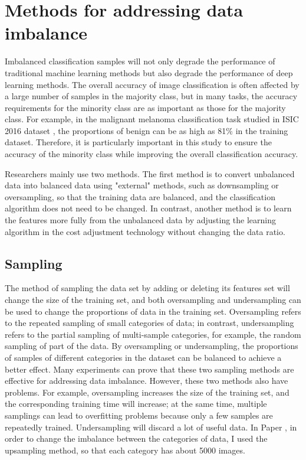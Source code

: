 \section{Methods for addressing data imbalance}

Imbalanced classification samples will not only degrade the performance of traditional machine learning methods but also degrade the performance of deep learning methods. The overall accuracy of image classification is often affected by a large number of samples in the majority class, but in many tasks, the accuracy requirements for the minority class are as important as those for the majority class. For example, in the malignant melanoma classification task studied in ISIC 2016 dataset \cite{gutman2016skin}, the proportions of benign can be as high as 81$\%$ in the training dataset. Therefore, it is particularly important in this study to ensure the accuracy of the minority class while improving the overall classification accuracy.

Researchers mainly use two methods. The first method is to convert unbalanced data into balanced data using "external" methods, such as downsampling or oversampling, so that the training data are balanced, and the classification algorithm does not need to be changed. In contrast, another method is to learn the features more fully from the unbalanced data by adjusting the learning algorithm in the cost adjustment technology without changing the data ratio.

\subsection{Sampling}
 The method of sampling the data set by adding or deleting its features set will change the size of the training set, and both oversampling and undersampling can be used to change the proportions of data in the training set. Oversampling refers to the repeated sampling of small categories of data; in contrast, undersampling refers to the partial sampling of multi-sample categories, for example, the random sampling of part of the data. By oversampling or undersampling, the proportions of samples of different categories in the dataset can be balanced to achieve a better effect. Many experiments can prove that these two sampling methods are effective for addressing data imbalance. However, these two methods also have problems. For example, oversampling increases the size of the training set, and the corresponding training time will increase; at the same time, multiple samplings can lead to overfitting problems because only a few samples are repeatedly trained. Undersampling will discard a lot of useful data. In Paper \uppercase\expandafter{}, in order to change the imbalance between the categories of data, I used the upsampling method, so that each category has about 5000 images.

